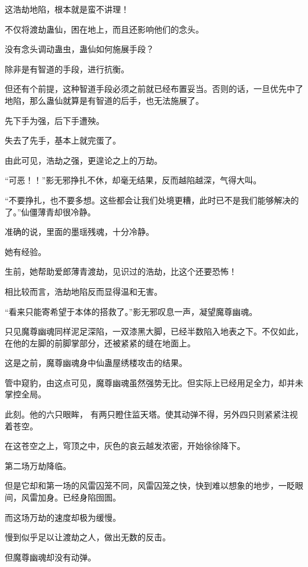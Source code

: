 
\begin{this_body}

这浩劫地陷，根本就是蛮不讲理！

不仅将渡劫蛊仙，困在地上，而且还影响他们的念头。

没有念头调动蛊虫，蛊仙如何施展手段？

除非是有智道的手段，进行抗衡。

但还有个前提，这种智道手段必须之前就已经布置妥当。否则的话，一旦优先中了地陷，那么蛊仙就算是有智道的后手，也无法施展了。

先下手为强，后下手遭殃。

失去了先手，基本上就完蛋了。

由此可见，浩劫之强，更遑论之上的万劫。

“可恶！！”影无邪挣扎不休，却毫无结果，反而越陷越深，气得大叫。

“不要挣扎，也不要多想。这些都会让我们处境更糟，此时已不是我们能够解决的了。”仙僵薄青却很冷静。

准确的说，里面的墨瑶残魂，十分冷静。

她有经验。

生前，她帮助爱郎薄青渡劫，见识过的浩劫，比这个还要恐怖！

相比较而言，浩劫地陷反而显得温和无害。

“看来只能寄希望于本体的搭救了。”影无邪叹息一声，凝望魔尊幽魂。

只见魔尊幽魂同样泥足深陷，一双漆黑大脚，已经半数陷入地表之下。不仅如此，在他的左脚的前脚掌部分，还被紧紧的缝在地面上。

这是之前，魔尊幽魂身中仙蛊屋绣楼攻击的结果。

管中窥豹，由这点可见，魔尊幽魂虽然强势无比。但实际上已经用足全力，却并未掌控全局。

此刻。他的六只眼眸， 有两只瞪住监天塔。使其动弹不得，另外四只则紧紧注视着苍空。

在这苍空之上，穹顶之中，灰色的哀云越发浓密，开始徐徐降下。

第二场万劫降临。

但是它却和第一场的风雷囚笼不同，风雷囚笼之快，快到难以想象的地步，一眨眼间，风雷加身。已经身陷囹圄。

而这场万劫的速度却极为缓慢。

慢到似乎足以让渡劫之人，做出无数的反击。

但魔尊幽魂却没有动弹。


\end{this_body}
